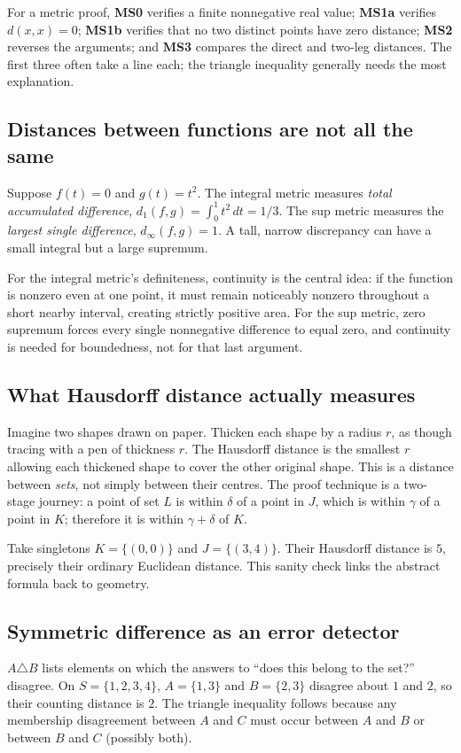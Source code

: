 \documentclass[11pt,a4paper]{article}
\begin{document}
For a metric proof, \textbf{MS0} verifies a finite nonnegative real value; \textbf{MS1a} verifies $d(x,x)=0$; \textbf{MS1b} verifies that no two distinct points have zero distance; \textbf{MS2} reverses the arguments; and \textbf{MS3} compares the direct and two-leg distances. The first three often take a line each; the triangle inequality generally needs the most explanation.
\subsection{Distances between functions are not all the same}
Suppose $f(t)=0$ and $g(t)=t^2$. The integral metric measures \emph{total accumulated difference}, $d_1(f,g)=\int_0^1t^2\,dt=1/3$. The sup metric measures the \emph{largest single difference}, $d_\infty(f,g)=1$. A tall, narrow discrepancy can have a small integral but a large supremum.

For the integral metric's definiteness, continuity is the central idea: if the function is nonzero even at one point, it must remain noticeably nonzero throughout a short nearby interval, creating strictly positive area. For the sup metric, zero supremum forces every single nonnegative difference to equal zero, and continuity is needed for boundedness, not for that last argument.
\subsection{What Hausdorff distance actually measures}
Imagine two shapes drawn on paper. Thicken each shape by a radius $r$, as though tracing with a pen of thickness $r$. The Hausdorff distance is the smallest $r$ allowing each thickened shape to cover the other original shape. This is a distance between \emph{sets}, not simply between their centres. The proof technique is a two-stage journey: a point of set $L$ is within $\delta$ of a point in $J$, which is within $\gamma$ of a point in $K$; therefore it is within $\gamma+\delta$ of $K$.

Take singletons $K=\{(0,0)\}$ and $J=\{(3,4)\}$. Their Hausdorff distance is $5$, precisely their ordinary Euclidean distance. This sanity check links the abstract formula back to geometry.
\subsection{Symmetric difference as an error detector}
$A\triangle B$ lists elements on which the answers to ``does this belong to the set?'' disagree. On $S=\{1,2,3,4\}$, $A=\{1,3\}$ and $B=\{2,3\}$ disagree about $1$ and $2$, so their counting distance is $2$. The triangle inequality follows because any membership disagreement between $A$ and $C$ must occur between $A$ and $B$ or between $B$ and $C$ (possibly both).
\end{document}
